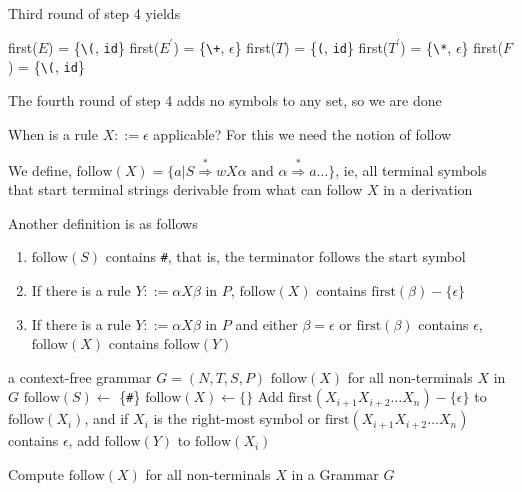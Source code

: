 \documentclass[8pt,a4paper,compress]{beamer}
\newcommand{\mm}[1]{$#1$}
\newcommand{\derives}{\stackrel{*}{\Rightarrow}}
\newcommand{\expo}[2]{$#1^{#2}$}
\newenvironment{spaced}
{
\smallskip
\hspace{.5cm}
\begin{minipage}[c]{\textwidth}
}
{
\end{minipage}
\smallskip
}
\begin{document}
\begin{frame}[fragile]
\pause

Third round of step 4 yields

\text{ }
\begin{spaced}
\begin{production}
first(\mm{E})  = \{\lstinline{\(}, \lstinline{id}\}
first(\expo{E}{\prime}) = \{\lstinline{\+}, \mm{\epsilon}\}
first(\mm{T})  = \{\lstinline{(}, \lstinline{id}\}
first(\expo{T}{\prime}) = \{\lstinline{\*}, \mm{\epsilon}\}
first(\mm{F})  = \{\lstinline{\(}, \lstinline{id}\}
\end{production}
\end{spaced}

\pause

The fourth round of step 4 adds no symbols to any set, so we are done

\pause
\bigskip

When is a rule $X ::= \epsilon$ applicable?  For this we need the notion of follow

\pause
\bigskip

We define, $\text{follow}(X) = \{a | S \derives wX\alpha \text{ and } \alpha \derives a \dots\}$, ie, all terminal symbols that start terminal strings derivable from what can follow $X$ in a derivation

\pause
\bigskip

Another definition is as follows
\begin{enumerate}
\item $\text{follow}(S)$ contains \lstinline{#}, that is, the terminator follows the start symbol
\item If there is a rule $Y ::= \alpha X \beta$ in $P$, $\text{follow}(X)$ contains $\text{first}(\beta) - \{\epsilon\}$
\item If there is a rule $Y ::= \alpha X \beta$ in $P$ and either $\beta = \epsilon$ or $\text{first}(\beta)$ contains $\epsilon$, $\text{follow}(X)$ contains $\text{follow}(Y)$
\end{enumerate}
\end{frame}

\begin{frame}[fragile]
\pause

\begin{algorithm}[H]
\begin{algorithmic}
\REQUIRE a context-free grammar $G = (N,T,S,P)$
\ENSURE  $\text{follow}(X)$ for all non-terminals $X$ in $G$
\STATE $\text{follow}(S) \gets$ \{\lstinline{#}\}
\STATE $\text{follow}(X) \gets \{\}$
\ENDFOR
\REPEAT
{}
\STATE Add $\text{first}(X_{i+1}X_{i+2} \dots X_n) - \{\epsilon\}$ to $\text{follow}(X_i)$, and
if $X_i$ is the right-most symbol or $\text{first}(X_{i+1}X_{i+2} \dots X_n)$ contains $\epsilon$, add $\text{follow}(Y)$ to $\text{follow}(X_i)$
\ENDFOR
\ENDFOR
{}
\end{algorithmic}
\caption{Compute $\text{follow}(X)$ for all non-terminals $X$ in a Grammar $G$}
\end{algorithm}
\end{frame}
\end{document}
